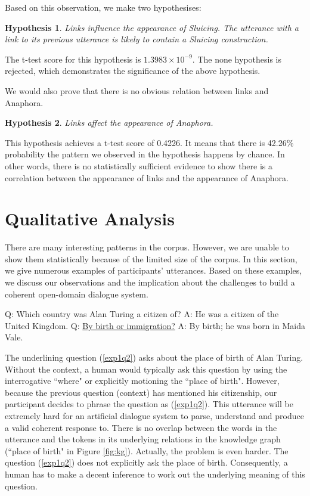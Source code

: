 \documentclass[bsc,frontabs,twoside,singlespacing,parskip,deptreport]{infthesis}     %
\newtheorem{hypo}{Hypothesis}[chapter]
\begin{document}
Based on this observation, we make two hypothesises:

\begin{hypo}
Links influence the appearance of Sluicing. The utterance with a link to its previous utterance is likely to contain a Sluicing construction.
\end{hypo}

The t-test score for this hypothesis is $1.3983 \times 10^{-9}$. The none hypothesis is rejected, which demonstrates the significance of the above hypothesis.

We would also prove that there is no obvious relation between links and Anaphora.

\begin{hypo}
Links affect the appearance of Anaphora.
\end{hypo}

This hypothesis achieves a t-test score of 0.4226. It means that there is 42.26\% probability the pattern we observed in the hypothesis happens by chance. In other words, there is no statistically sufficient evidence to show there is a correlation between the appearance of links and the appearance of Anaphora.

\section{Qualitative Analysis}

There are many interesting patterns in the corpus. However, we are unable to show them statistically because of the limited size of the corpus. In this section, we give numerous examples of participants' utterances. Based on these examples, we discuss our observations and the implication about the challenges to build a coherent open-domain dialogue system.

\begin{exe}
	\ex
		\begin{xlist}
			\ex \label{exp1q1} Q: Which country was Alan Turing a citizen of?
			\ex \label{exp1a1} A: He was a citizen of the United Kingdom.
			\ex \label{exp1q2} Q: \underline{By birth or immigration?}
			\ex \label{exp1a2} A: By birth; he was born in Maida Vale.
	\end{xlist}
\end{exe}

The underlining question (\ref{exp1q2}) asks about the place of birth of Alan Turing. Without the context, a human would typically ask this question by using the interrogative ``where" or explicitly motioning the ``place of birth". However, because the previous question (context) has mentioned his citizenship, our participant decides to phrase the question as (\ref{exp1q2}). This utterance will be extremely hard for an artificial dialogue system to parse, understand and produce a valid coherent response to. There is no overlap between the words in the utterance and the tokens in its underlying relations in the knowledge graph (``place of birth" in Figure \ref{fig:kg}). Actually, the problem is even harder. The question (\ref{exp1q2}) does not explicitly ask the place of birth. Consequently, a human has to make a decent inference to work out the underlying meaning of this question.
\end{document}
